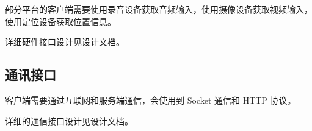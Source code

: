 部分平台的客户端需要使用录音设备获取音频输入，使用摄像设备获取视频输入，使用定位设备获取位置信息。

详细硬件接口设计见设计文档。

\subsection{通讯接口}
% 
% 
% 

客户端需要通过互联网和服务端通信，会使用到 Socket 通信和 HTTP 协议。

详细的通信接口设计见设计文档。